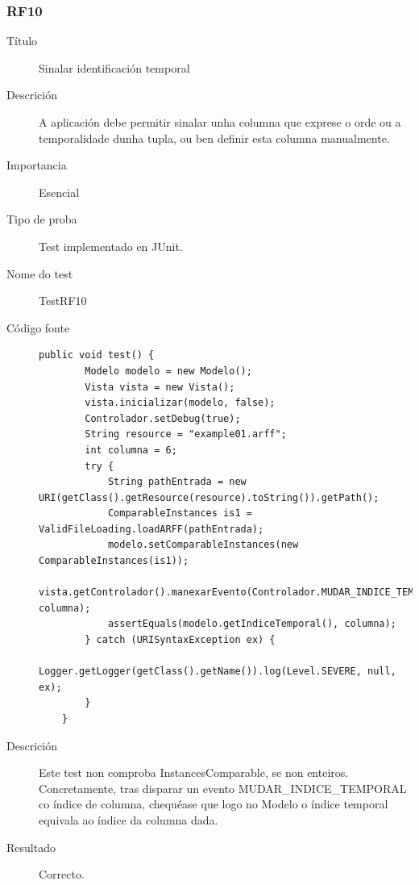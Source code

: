 \subsubsection*{RF10}
\begin{description}
\item[Título] \hfill
Sinalar identificación temporal
\item[Descrición] \hfill
A aplicación debe permitir sinalar unha columna que exprese o orde ou a temporalidade dunha tupla, ou ben definir esta columna manualmente.
\item[Importancia] \hfill
Esencial
\item[Tipo de proba] \hfill
Test implementado en JUnit.
\item[Nome do test] \hfill
TestRF10
\item[Código fonte]
\begin{lstlisting}
public void test() {
        Modelo modelo = new Modelo();
        Vista vista = new Vista();
        vista.inicializar(modelo, false);
        Controlador.setDebug(true);
        String resource = "example01.arff";
        int columna = 6;
        try {
            String pathEntrada = new URI(getClass().getResource(resource).toString()).getPath();
            ComparableInstances is1 = ValidFileLoading.loadARFF(pathEntrada);
            modelo.setComparableInstances(new ComparableInstances(is1));
            vista.getControlador().manexarEvento(Controlador.MUDAR_INDICE_TEMPORAL, columna);
            assertEquals(modelo.getIndiceTemporal(), columna);
        } catch (URISyntaxException ex) {
            Logger.getLogger(getClass().getName()).log(Level.SEVERE, null, ex);
        }
    }
\end{lstlisting}
\item[Descrición]
Este test non comproba InstancesComparable, se non enteiros. Concretamente, tras disparar un evento MUDAR\_INDICE\_TEMPORAL co índice de columna, chequéase que logo no Modelo o índice temporal equivala ao índice da columna dada.
\item[Resultado]
Correcto.
\end{description}

